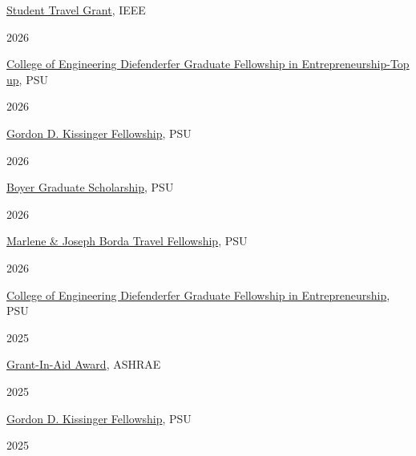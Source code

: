 \documentclass[]{Keval-resume}
\begin{document}
{{\begin{minipage}[t]{.95\textwidth}
	\textbullet{}  \href{}{Student Travel Grant}, IEEE
\end{minipage}%
\begin{minipage}[t]{.05\textwidth}
	\hfill 2026
\end{minipage}
\begin{minipage}[t]{.95\textwidth}
	\textbullet{}  \href{}{College of Engineering Diefenderfer Graduate Fellowship in Entrepreneurship-Top up}, PSU
\end{minipage}%
\begin{minipage}[t]{.05\textwidth}
	\hfill 2026
\end{minipage}
\begin{minipage}[t]{.95\textwidth}
	\textbullet{}  {\href{}{Gordon D. Kissinger Fellowship}, PSU} 
\end{minipage}%
\begin{minipage}[t]{.05\textwidth}
	\hfill 2026
\end{minipage}
\begin{minipage}[t]{.95\textwidth}
	\textbullet{}  {\href{}{Boyer Graduate Scholarship}, PSU} 
\end{minipage}%
\begin{minipage}[t]{.05\textwidth}
	\hfill 2026
\end{minipage}
\begin{minipage}[t]{.95\textwidth}
	\textbullet{}  {\href{}{Marlene \& Joseph Borda Travel Fellowship}, PSU} 
\end{minipage}%
\begin{minipage}[t]{.05\textwidth}
	\hfill 2026
\end{minipage}
\begin{minipage}[t]{.95\textwidth}
	\textbullet{}  {\href{}{College of Engineering Diefenderfer Graduate Fellowship in Entrepreneurship}, PSU} 
\end{minipage}%
\begin{minipage}[t]{.05\textwidth}
	\hfill 2025
\end{minipage}
\begin{minipage}[t]{.95\textwidth}
	\textbullet{}  {\href{https://news.engr.psu.edu/2025/viswanathan-ganesh-ashrae-grant-in-aid.aspx}{Grant-In-Aid Award}, ASHRAE} 
\end{minipage}%
\begin{minipage}[t]{.05\textwidth}
	\hfill 2025
\end{minipage}

\begin{minipage}[t]{.95\textwidth}
	\textbullet{}  {\href{https://sites.psu.edu/sbslab/2025/01/06/sbs-lab-member-viswanathan-ganesh-receives-two-fellowships/}{Gordon D. Kissinger Fellowship}, PSU} 
\end{minipage}%
\begin{minipage}[t]{.05\textwidth}
	\hfill 2025
\end{minipage}

}}
\end{document}
